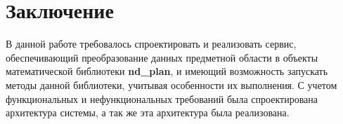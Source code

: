 \section*{\Large{Заключение}}
В данной работе требовалось спроектировать и реализовать сервис, обеспечивающий
преобразование данных предметной области в объекты математической библиотеки \textbf{nd\_plan},
и имеющий возможность запускать методы данной библиотеки, учитывая особенности их выполнения.
С учетом функциональных и нефункциональных требований была спроектирована архитектура системы,
а так же эта архитектура была реализована.
